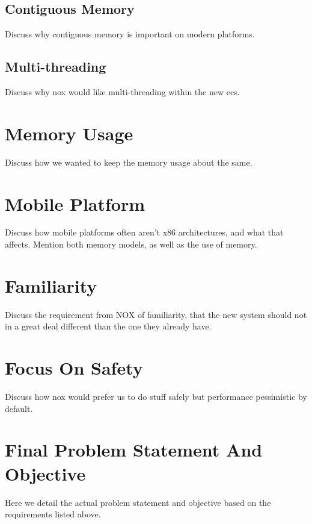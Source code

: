 \subsection{Contiguous Memory}
Discuss why contiguous memory is important on modern platforms.

\subsection{Multi-threading}
Discuss why nox would like multi-threading within the new ecs.

\section{Memory Usage}
Discuss how we wanted to keep the memory usage about the same.

\section{Mobile Platform}
Discuss how mobile platforms often aren't x86 architectures, and what that affects.
Mention both memory models, as well as the use of memory.

\section{Familiarity}
Discuss the requirement from NOX of familiarity, that the new system should not in a great deal different
than the one they already have.

\section{Focus On Safety}
Discuss how nox would prefer us to do stuff safely but performance pessimistic by default.

\section{Final Problem Statement And Objective}
Here we detail the actual problem statement and objective based on the requirements listed above.

